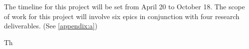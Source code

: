 



The timeline for this project will be set from April 20 to October 18. The scope of work for this project will involve six epics in conjunction with four research deliverables. (See \ref{appendix:a})

Th









